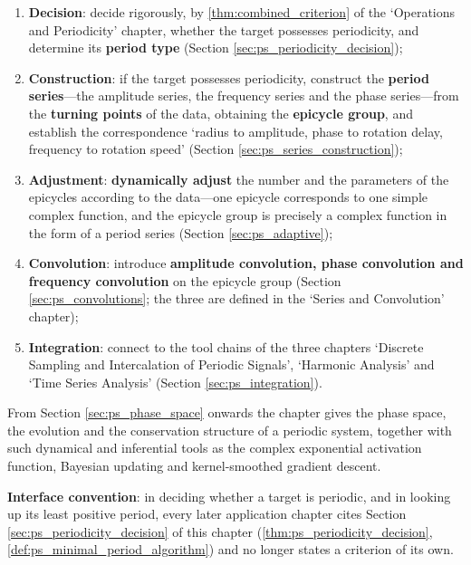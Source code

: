 \begin{remark}
\begin{enumerate}[label=(\arabic*)]
    \item \textbf{Decision}: decide rigorously, by \cref{thm:combined_criterion} of the `Operations and Periodicity' chapter, whether the target possesses periodicity, and determine its \textbf{period type} (Section \ref{sec:ps_periodicity_decision});
    \item \textbf{Construction}: if the target possesses periodicity, construct the \textbf{period series}---the amplitude series, the frequency series and the phase series---from the \textbf{turning points} of the data, obtaining the \textbf{epicycle group}, and establish the correspondence `radius to amplitude, phase to rotation delay, frequency to rotation speed' (Section \ref{sec:ps_series_construction});
    \item \textbf{Adjustment}: \textbf{dynamically adjust} the number and the parameters of the epicycles according to the data---one epicycle corresponds to one simple complex function, and the epicycle group is precisely a complex function in the form of a period series (Section \ref{sec:ps_adaptive});
    \item \textbf{Convolution}: introduce \textbf{amplitude convolution, phase convolution and frequency convolution} on the epicycle group (Section \ref{sec:ps_convolutions}; the three are defined in the `Series and Convolution' chapter);
    \item \textbf{Integration}: connect to the tool chains of the three chapters `Discrete Sampling and Intercalation of Periodic Signals', `Harmonic Analysis' and `Time Series Analysis' (Section \ref{sec:ps_integration}).
\end{enumerate}

From Section \ref{sec:ps_phase_space} onwards the chapter gives the phase space, the evolution and the conservation structure of a periodic system, together with such dynamical and inferential tools as the complex exponential activation function, Bayesian updating and kernel-smoothed gradient descent.

\textbf{Interface convention}: in deciding whether a target is periodic, and in looking up its least positive period, every later application chapter cites Section \ref{sec:ps_periodicity_decision} of this chapter (\cref{thm:ps_periodicity_decision}, \cref{def:ps_minimal_period_algorithm}) and no longer states a criterion of its own.
\end{remark}

